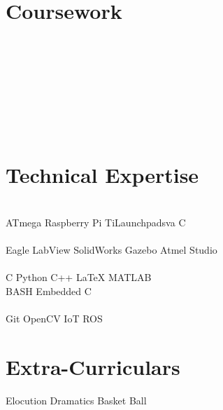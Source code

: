 \documentclass[letterpaper]{akhilesh}
\begin{document}
\begin{minipage}[t]{0.39\textwidth}

\section{Coursework}
\\
 \\
 \\
\\
\\
\\
\\
\href{https://www.coursera.org/account/accomplishments/certificate/QS5GBKTUNU2G}{}
\sectionsep



\section{Technical Expertise}
\\
ATmega \textbullet{} Raspberry Pi \textbullet{} TiLaunchpadsva C\\
{}\\
Eagle \textbullet{} LabView \textbullet{} SolidWorks \textbullet{} Gazebo \textbullet{} Atmel Studio\\
{}\\
 C  \textbullet{} Python \textbullet{} C++ \textbullet{}   \LaTeX  \textbullet{} MATLAB\\BASH \textbullet{} Embedded C\\
{}\\
Git \textbullet{} OpenCV \textbullet{} IoT \textbullet{} ROS\\
\sectionsep



\section{Extra-Curriculars}  
Elocution \textbullet{} Dramatics \textbullet{} Basket Ball\\
\sectionsep


\end{minipage} 
\end{document}

